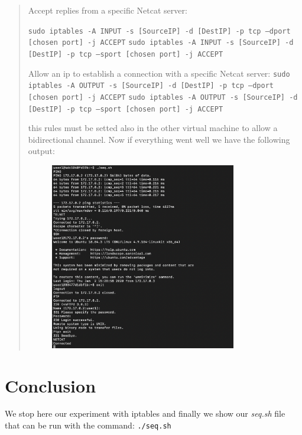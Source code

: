 \documentclass[11pt]{article}
\begin{document}
\begin{quote}
  Accept replies from a specific Netcat server:

  \texttt{sudo iptables -A INPUT -s [SourceIP] -d [DestIP] -p tcp --dport [chosen port] -j ACCEPT}\newline
  \texttt{sudo iptables -A INPUT -s [SourceIP] -d [DestIP] -p tcp --sport [chosen port] -j ACCEPT}\newline

  Allow an ip to establish a connection with a specific Netcat server:
  \texttt{sudo iptables -A OUTPUT -s [SourceIP] -d [DestIP] -p tcp --dport [chosen port] -j ACCEPT}\newline
  \texttt{sudo iptables -A OUTPUT -s [SourceIP] -d [DestIP] -p tcp --sport [chosen port] -j ACCEPT}\newline

  this rules must be setted also in the other virtual machine to allow a bidirectional channel. Now if everything went well we have the following output:

\newpage
  \begin{figure}[!ht]
    \centering
    \includegraphics[width=0.8\textwidth]{pic8-hw8-1635747.png}
    \label{fig:conf}
  \end{figure}
\end{quote}

\section{Conclusion}
We stop here our experiment with iptables and finally we show our {\em seq.sh} file that can be run with the command: \texttt{./seq.sh}
\end{document}
